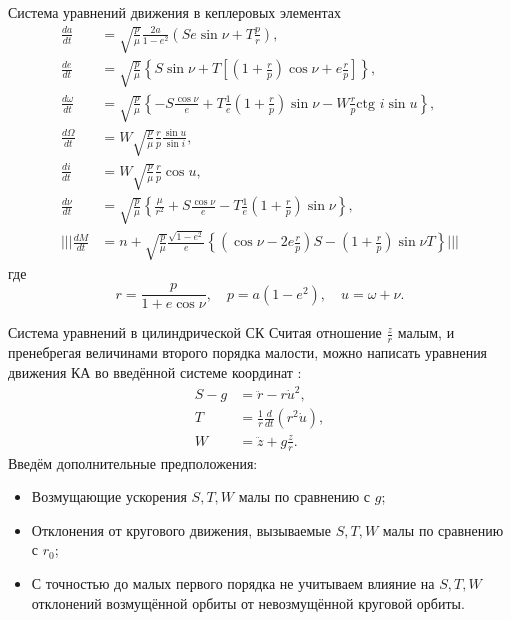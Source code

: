\documentclass[9pt]{beamer}
\begin{document}
\begin{frame}{Система уравнений движения в кеплеровых элементах}
\begin{equation*}
    \begin{aligned}
        \frac{da}{dt} &= \sqrt{\frac{p}{\mu}} \frac{2a}{1 - e^2} \left( S e \sin \nu + T \frac{p}{r} \right), \\
        \frac{de}{dt} &= \sqrt{\frac{p}{\mu}} \left\{ S \sin \nu + T \left[ \left(1 + \frac{r}{p} \right) \cos \nu + e \frac{r}{p} \right] \right\}, \\
        \frac{d \omega}{dt} &= \sqrt{\frac{p}{\mu}} \left\{ -S \frac{\cos \nu}{e} + T \frac{1}{e}  \left(1 + \frac{r}{p} \right) \sin \nu - W \frac{r}{p} \text{ctg } i \sin u  \right\}, \\
        \frac{d \Omega}{dt} &= W \sqrt{\frac{p}{\mu}} \frac{r}{p} \frac{\sin u}{\sin i}, \\
        \frac{d i}{dt} &= W \sqrt{\frac{p}{\mu}} \frac{r}{p} \cos u, \\
        \frac{d \nu}{dt} &= \sqrt{\frac{p}{\mu}} \left\{ \frac{\mu}{r^2} +  S \frac{\cos \nu}{e} - T \frac{1}{e} \left(1 + \frac{r}{p} \right) \sin \nu \right\}, \\
        ||| \frac{d M}{dt} &= n + \sqrt{\frac{p}{\mu}} \frac{\sqrt{1 - e^2}}{e} \left\{ \left( \cos \nu - 2e \frac{r}{p} \right) S - \left(1 + \frac{r}{p} \right) \sin \nu T \right\} |||
    \end{aligned}
\end{equation*}
где 
\begin{equation*}
    r = \frac{p}{1 + e \cos \nu}, \quad p = a (1 - e^2), \quad u = \omega + \nu.
\end{equation*}
\end{frame}

\begin{frame}{Система уравнений в цилиндрической СК}
Считая отношение $\frac{z}{r}$ малым, и пренебрегая величинами второго порядка малости, можно написать уравнения движения КА во введённой системе координат \cite{Suslov}:
\begin{equation*}
    \begin{aligned}
        S - g &= \ddot{r} - r\dot{u}^2, \\
        T &= \frac{1}{r} \frac{d}{dt} (r^2 \dot{u}), \\
        W &= \ddot{z} + g \frac{z}{r}.
    \end{aligned}
\end{equation*}
Введём дополнительные предположения:
\begin{itemize}
    \item Возмущающие ускорения $S, T, W$ малы по сравнению с $g$;
    \item Отклонения от кругового движения, вызываемые $S, T, W$ малы по сравнению с $r_0$;
    \item С точностью до малых первого порядка не учитываем влияние на $S, T, W$ отклонений возмущённой орбиты от невозмущённой круговой орбиты.
\end{itemize}
\end{frame}
\end{document}
